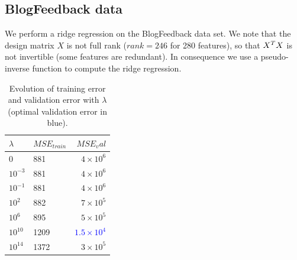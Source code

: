 \documentclass[twoside]{article}
\begin{document}
\subsection{BlogFeedback data}
We perform a ridge regression on the BlogFeedback data set. We note that the design matrix $X$ is not full rank ($rank=246$ for 280 features), so that $X^T \* X$ is not invertible (some features are redundant). In consequence we use a pseudo-inverse function to compute the ridge regression.
\begin{table}[H]
\caption{Evolution of training error and validation error with $\lambda$ (optimal validation error in blue).}
\centering
\begin{tabular}{llr}
\toprule
$\lambda$ & $MSE_{train}$ & $MSE_val$\\
\midrule
$0$ & 881 & $4 \times 10^6$\\
$10^{-3}$ & 881 & $4 \times 10^6$\\
$10^{-1}$ & 881 &  $4 \times 10^6$\\
$10^{2}$ & 882 & $7 \times 10^5$\\
$10^{6}$ & 895 & $5 \times 10^5$\\
$10^{10}$ & 1209 & \textcolor{blue}{$1.5 \times 10^4$}\\
$10^{14}$ & 1372 & $3 \times 10^5$\\
\bottomrule
\end{tabular}
\end{table}
\end{document}
